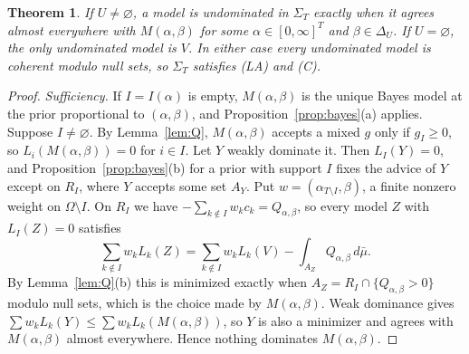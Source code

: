 \documentclass[11pt]{article}
\newtheorem{theorem}{Theorem}
\theoremstyle{remark}\newtheorem{remark}[theorem]{Remark}
\begin{document}
\begin{theorem}\label{thm:undominated}
If $U\ne\varnothing$, a model is undominated in $\Sigma_T$ exactly when it
agrees almost everywhere with $M(\alpha,\beta)$ for some
$\alpha\in[0,\infty]^T$ and $\beta\in\Delta_U$. If $U=\varnothing$, the only
undominated model is $V$. In either case every undominated model is
coherent modulo null sets, so $\Sigma_T$ satisfies (LA) and (C).
\end{theorem}
\begin{proof}
\emph{Sufficiency.} If $I=I(\alpha)$ is empty, $M(\alpha,\beta)$ is the
unique Bayes model at the prior proportional to $(\alpha,\beta)$, and
Proposition~\ref{prop:bayes}(a) applies. Suppose $I\ne\varnothing$. By
Lemma~\ref{lem:Q}, $M(\alpha,\beta)$ accepts a mixed $g$ only if $g_I\ge0$,
so $L_i(M(\alpha,\beta))=0$ for $i\in I$. Let $Y$ weakly dominate it. Then
$L_I(Y)=0$, and Proposition~\ref{prop:bayes}(b) for a prior with support
$I$ fixes the advice of $Y$ except on $R_I$, where $Y$ accepts some set
$A_Y$. Put $w=(\alpha_{T\setminus I},\beta)$, a finite nonzero weight on
$\Omega\setminus I$. On $R_I$ we have
$-\sum_{k\notin I}w_kc_k=Q_{\alpha,\beta}$, so every model $Z$ with
$L_I(Z)=0$ satisfies
\[
 \sum_{k\notin I}w_kL_k(Z)=\sum_{k\notin I}w_kL_k(V)
 -\int_{A_Z}Q_{\alpha,\beta}\,d\bar\mu.
\]
By Lemma~\ref{lem:Q}(b) this is minimized exactly when
$A_Z=R_I\cap\{Q_{\alpha,\beta}>0\}$ modulo null sets, which is the choice
made by $M(\alpha,\beta)$. Weak dominance gives
$\sum w_kL_k(Y)\le\sum w_kL_k(M(\alpha,\beta))$, so $Y$ is also a minimizer
and agrees with $M(\alpha,\beta)$ almost everywhere. Hence nothing
dominates $M(\alpha,\beta)$.


\end{proof}
\end{document}

